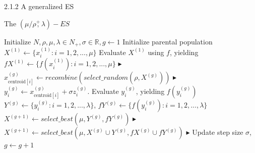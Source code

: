 \documentclass{beamer}
\begin{document}
\begin{frame}{2.1.2 A generalized ES}
\begin{block}{The $(\mu/\rho\overset{+}{,}\lambda)-ES$}
 \footnotesize{
    \begin{algorithm}[H]
    \begin{algorithmic}[1]
        \STATE Initialize $N,\rho,\mu,\lambda \in N_+,\sigma \in \mathbb{R}, g \leftarrow 1$
        \STATE Initialize parental population $X^{(1)} \leftarrow \{x_i^{(1)}: i=1,2,...,\mu\}$
        \STATE Evaluate $X^{(1)}$ using $f$, yielding $fX^{(1)} \leftarrow \{ f(x_i^{(1)}): i=1,2,...,\mu \}$
        	        \hfill$\blacktriangleright$ %
        		\STATE $x_{\text{centroid}[i]}^{(g)} \leftarrow  recombine (select\_random (\rho,X^{(g)}))$  
        		    \hfill$\blacktriangleright$ %
        		\STATE $y_i^{(g)} \leftarrow x_{\text{centroid}[i]}^{(g)} + \sigma z_i^{(g)}$. Evaluate $y_i^{(g)}$, yielding $f(y_i^{(g)})$
        	\ENDFOR
        	\STATE $Y^{(g)} \leftarrow \{y_i^{(g)}: i=1,2,...,\lambda\}$,  $fY^{(g)} \leftarrow \{f(y_i^{(g)}): i=1,2,...,\lambda\}$
        		\STATE $X^{(g+1)} \leftarrow  select\_best
        		(\mu,Y^{(g)},fY^{(g)})$
        		    \hfill$\blacktriangleright$ %
        		\STATE $X^{(g+1)} \leftarrow  select\_best (\mu,X^{(g)} \cup Y^{(g)},fX^{(g)} \cup fY^{(g)})$
        		    \hfill$\blacktriangleright$ %
        	\ENDIF
        	\STATE Update step size $\sigma$, $g\leftarrow g+1$
        \ENDWHILE
    \end{algorithmic}
    \end{algorithm}
}
\end{block}
\end{frame}
\end{document}
